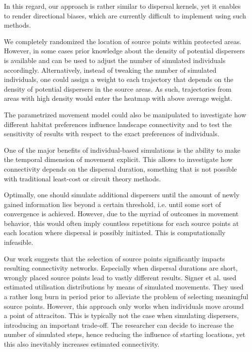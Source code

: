 \documentclass[abstract=on,10pt,a4paper,bibliography=totocnumbered]{article}
\begin{document}
In this regard, our approach is rather similar to dispersal kernels, yet it
enables to render directional biases, which are currently difficult to implement
using such methods.

We completely randomized the location of source points within protected areas.
However, in some cases prior knowledge about the density of potential dispersers
is available and can be used to adjust the number of simulated individuals
accordingly. Alternatively, instead of tweaking the number of simulated
individuals, one could assign a weight to each trajectory that depends on the
density of potential dispersers in the source areas. As such, trajectories from
areas with high density would enter the heatmap with above average weight.

The parametrized movement model could also be manipulated to investigate how
different habitat preferences influence landscape connectivity and to test the
sensitivity of results with respect to the exact preferences of individuals.

One of the major benefits of individual-based simulations is the ability to make
the temporal dimension of movement explicit. This allows to investigate how
connectivity depends on the dispersal duration, something that is not possible
with traditional least-cost or circuit theory methods.

Optimally, one should simulate additional dispersers until the amount of newly
gained information lies beyond a certain threshold, i.e. until some sort of
convergence is achieved. However, due to the myriad of outcomes in movement
behavior, this would often imply countless repetitions for each source points at
each location where dispersal is possibly initiated. This is computationally
infeasible.

Our work suggests that the selection of source points significantly impacts
resulting connectivity networks. Especially when dispersal durations are short,
wrongly placed source points lead to vastly different results. Signer et al.
used estimated utilisation distributions by means of simulated movements. They
used a rather long burn in period prior to alleviate the problem of selecting
meaningful source points. However, this approach only works when individuals
move around a point of attraciton. This is typically not the case when
simulating dispersers, introducing an important trade-off. The researcher can
decide to increase the number of simulated steps, hence reducing the influence
of starting locations, yet this also inevitably increases estimated
connectivity.
\end{document}
